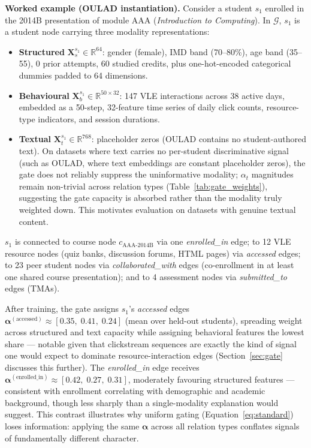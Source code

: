 \documentclass[sigconf,review]{acmart}
\begin{document}
\textbf{Worked example (OULAD instantiation).}
Consider a student $s_1$ enrolled in the 2014B presentation
of module AAA (\emph{Introduction to Computing}).
In $\mathcal{G}$, $s_1$ is a student node carrying three
modality representations:
\begin{itemize}
  \item \textbf{Structured} $\mathbf{X}_s^{s_1}
    \in \mathbb{R}^{64}$: gender (female), IMD band
    (70--80\%), age band (35--55), 0 prior attempts,
    60 studied credits, plus one-hot-encoded
    categorical dummies padded to 64 dimensions.
  \item \textbf{Behavioural} $\mathbf{X}_b^{s_1}
    \in \mathbb{R}^{50 \times 32}$: 147 VLE
    interactions across 38 active days, embedded as
    a 50-step, 32-feature time series of daily
    click counts, resource-type indicators, and
    session durations.
  \item \textbf{Textual} $\mathbf{X}_t^{s_1}
    \in \mathbb{R}^{768}$: placeholder zeros
    (OULAD contains no student-authored text). On
    datasets where text carries no per-student
    discriminative signal (such as OULAD, where text
    embeddings are constant placeholder zeros), the
    gate does not reliably suppress the uninformative
    modality; $\alpha_t$ magnitudes remain non-trivial
    across relation types
    (Table~\ref{tab:gate_weights}), suggesting the
    gate capacity is absorbed rather than the modality
    truly weighted down. This motivates evaluation on
    datasets with genuine textual content.
\end{itemize}

$s_1$ is connected to course node
$c_{\text{AAA-2014B}}$ via one \emph{enrolled\_in}
edge; to 12 VLE resource nodes (quiz banks,
discussion forums, HTML pages) via \emph{accessed}
edges; to 23 peer student nodes via
\emph{collaborated\_with} edges (co-enrollment
in at least one shared course presentation); and to
4 assessment nodes via \emph{submitted\_to} edges
(TMAs).

After training, the gate assigns $s_1$'s
\emph{accessed} edges
$\boldsymbol{\alpha}^{(\text{accessed})} \approx
[0.35,\;0.41,\;0.24]$ (mean over held-out students),
spreading weight across structured and text capacity
while assigning behavioral features the lowest share
--- notable given that clickstream sequences are
exactly the kind of signal one would expect to
dominate resource-interaction edges
(Section~\ref{sec:gate} discusses this further).
The \emph{enrolled\_in} edge receives
$\boldsymbol{\alpha}^{(\text{enrolled\_in})} \approx
[0.42,\;0.27,\;0.31]$, moderately favouring structured
features --- consistent with enrollment correlating
with demographic and academic background, though less
sharply than a single-modality explanation would
suggest. This contrast illustrates why
uniform gating (Equation~\ref{eq:standard}) loses
information: applying the same $\boldsymbol{\alpha}$
across all relation types conflates signals of
fundamentally different character.
\end{document}
